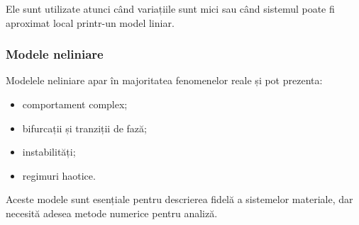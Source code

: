 \documentclass[12pt,a4paper]{article}
\begin{document}
Ele sunt utilizate atunci când variațiile sunt mici sau când sistemul poate fi aproximat local printr-un model liniar.

\subsubsection*{Modele neliniare}
Modelele neliniare apar în majoritatea fenomenelor reale și pot prezenta:
\begin{itemize}
    \item comportament complex;
    \item bifurcații și tranziții de fază;
    \item instabilități;
    \item regimuri haotice.
\end{itemize}

Aceste modele sunt esențiale pentru descrierea fidelă a sistemelor materiale, dar necesită adesea metode numerice pentru analiză.
\end{document}
